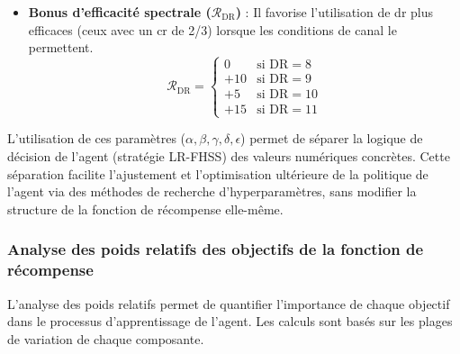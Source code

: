 \begin{itemize}
	\[ \mathcal{R}_{\text{SNR}} = 
	\begin{cases} 
		+\delta & \text{si } -5 \leq \text{SNR} \leq 5 \text{ dB (Optimal)} \\
		-\epsilon \cdot \max(0, \text{SNR} - 10) & \text{si } \text{SNR} > 10 \text{ dB (Overkill)} \\
		0 & \text{sinon}
	\end{cases} \]
	
	Avec $\delta = 20$ et $\epsilon = 4$. La zone de SNR ``optimale'' est définie comme une marge suffisante pour garantir la réception sans excès.
	
	\item \textbf{Bonus d'efficacité spectrale ($\mathcal{R}_{\text{DR}}$)} : Il favorise l'utilisation de \gls{dr} plus efficaces (ceux avec un \gls{cr} de 2/3) lorsque les conditions de canal le permettent.
	\begin{equation}
		\mathcal{R}_{\text{DR}} =
		\begin{cases}
			0 & \text{si DR} = 8 \\
			+10 & \text{si DR} = 9 \\
			+5 & \text{si DR} = 10 \\
			+15 & \text{si DR} = 11
		\end{cases}
	\end{equation}
\end{itemize}


L'utilisation de ces paramètres ($\alpha, \beta, \gamma, \delta, \epsilon$) permet de séparer la logique de décision de l'agent (stratégie LR-FHSS) des valeurs numériques concrètes. Cette séparation facilite l'ajustement et l'optimisation ultérieure de la politique de l'agent via des méthodes de recherche d'hyperparamètres, sans modifier la structure de la fonction de récompense elle-même.


\subsubsection{Analyse des poids relatifs des objectifs de la fonction de récompense}
\label{subsec:poids-relatifs-objectifs}

L'analyse des poids relatifs permet de quantifier l'importance de chaque objectif dans le processus d'apprentissage de l'agent. Les calculs sont basés sur les plages de variation de chaque composante.



